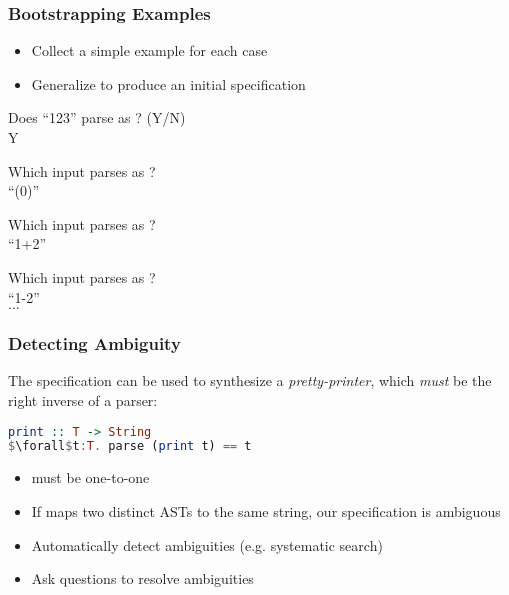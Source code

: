 \begin{frame}[fragile]
\frametitle{Bootstrapping Examples}

\begin{itemize}
\item Collect a simple example for each case
\item Generalize to produce an initial specification
\end{itemize}

\vspace{5mm}

\Q Does ``123'' parse as ? (Y/N)\\
\A Y
\vspace{2mm}

\Q Which input parses as ?\\
\A ``(0)''\\
\vspace{2mm}

\Q Which input parses as ?\\
\A ``1+2''\\
\vspace{2mm}

\Q Which input parses as ?\\
\A ``1-2''\\

$\dots$

\end{frame}

\begin{frame}[fragile]
\frametitle{Detecting Ambiguity}

The specification can be used to synthesize a {\em pretty-printer},
which {\em must} be the right inverse of a parser:

\begin{lstlisting}[mathescape, language=haskell]
print :: T -> String
$\forall$t:T. parse (print t) == t
\end{lstlisting}

\begin{itemize}
\item{ must be one-to-one}
\item{If  maps two distinct ASTs to the same
    string, our specification is ambiguous}
\item{Automatically detect ambiguities (e.g. systematic search)}
\item{Ask questions to resolve ambiguities}
\end{itemize}
\end{frame}

